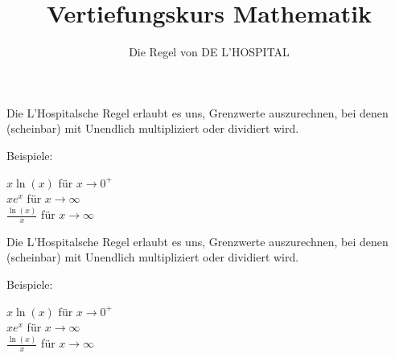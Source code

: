 \documentclass[11pt]{beamer}
\begin{document}
\title{Vertiefungskurs Mathematik}   
\author{Die Regel von DE L'HOSPITAL} 
\date{}
\frame{\titlepage} 

\begin{frame}[fragile]


Die L'Hospitalsche Regel erlaubt es uns, Grenzwerte auszurechnen, bei denen (scheinbar) mit Unendlich multipliziert oder dividiert wird.

Beispiele:

$x \ln(x)$ für $x \rightarrow 0^+$ \\
$x e^x$ für $x \rightarrow \infty$ \\
$\frac{\ln(x)}{x}$ für $x \rightarrow \infty$ \\

\end{frame}


\begin{frame}[fragile]


Die L'Hospitalsche Regel erlaubt es uns, Grenzwerte auszurechnen, bei denen (scheinbar) mit Unendlich multipliziert oder dividiert wird.

Beispiele:

$x \ln(x)$ für $x \rightarrow 0^+$ \\
$x e^x$ für $x \rightarrow \infty$ \\
$\frac{\ln(x)}{x}$ für $x \rightarrow \infty$ \\

\end{frame}


 

 
\end{document}
